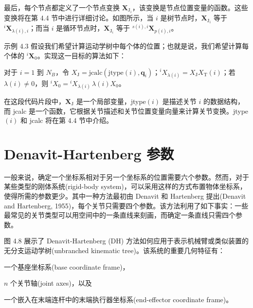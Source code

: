 \documentclass[10pt,a4paper]{book}
\theoremstyle{thmstyle} %
\theoremstyle{defstyle} %
\theoremstyle{prostyle} %
\begin{document}
最后，每个节点都定义了一个节点变换 $\mathbf{X}_{\mathrm{J}_{i}}$，该变换是节点位置变量的函数。这些变换将在第 4.4 节中进行详细讨论。如图所示，当 $i$ 是树节点时，$\mathbf{X}_{\mathrm{J}_{i}}$ 等于 ${}^{i}\mathbf{X}_{\lambda(i),i}$；而当 $i$ 是循环节点时，$\mathbf{X}_{\mathrm{J}_{i}}$ 等于 ${}^{s(i),i}\mathbf{X}_{p(i),i}$。



示例 4.3 假设我们希望计算运动学树中每个体的位置；也就是说，我们希望计算每个体的 ${}^{i}\mathbf{X}_{0}$。实现这一目标的算法如下：



对于 $i=1$ 到 $N_{B}$，令 $X_{\mathrm{J}} = \mathrm{jcalc}(\mathrm{jtype}(i),\boldsymbol{q}_{i})$；$^{i}X_{\lambda(i)} = X_{\mathrm{J}}X_{\mathrm{T}}(i)$；若 $\lambda(i)\neq0$，则 $^{i}X_{0} = {}^{i}X_{\lambda(i)}\,\lambda(i)X_{0}$。



在这段代码片段中，$\mathbf{X}_{\mathrm{J}}$ 是一个局部变量，jtype$(i)$ 是描述关节 $i$ 的数据结构，而 jcalc 是一个函数，它根据关节描述和关节位置变量向量来计算关节变换。jtype$(i)$ 和 jcalc 将在第 4.4 节中介绍。





\section{Denavit-Hartenberg 参数}





一般来说，确定一个坐标系相对于另一个坐标系的位置需要六个参数。然而，对于某些类型的刚体系统(rigid-body system)，可以采用这样的方式布置物体坐标系，使得所需的参数更少。其中一种方法最初由 Denavit 和 Hartenberg 提出(Denavit and Hartenberg, 1955)，每个关节只需要四个参数。该方法利用了如下事实：一些最常见的关节类型可以用空间中的一条直线来刻画，而确定一条直线只需四个参数。



图 4.8 展示了 Denavit-Hartenberg (DH) 方法如何应用于表示机械臂或类似装置的无分支运动学树(unbranched kinematic tree)。该系统的重要几何特征有：



一个基座坐标系(base coordinate frame)，



$n$ 个关节轴(joint axes)，以及



一个嵌入在末端连杆中的末端执行器坐标系(end-effector coordinate frame)。
\end{document}
